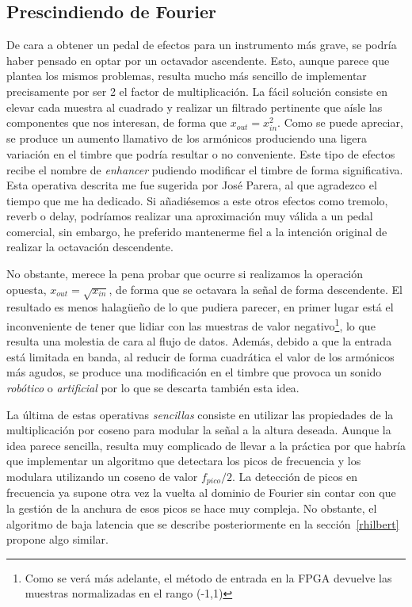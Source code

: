 \subsection{Prescindiendo de Fourier}
\label{nofourier}
De cara a obtener un pedal de efectos para un instrumento más grave, se podría haber pensado en optar por un octavador ascendente. Esto, aunque parece que plantea los mismos problemas, resulta mucho más sencillo de implementar precisamente por ser 2 el factor de multiplicación. La fácil solución consiste en elevar cada muestra al cuadrado y realizar un filtrado pertinente que aísle las componentes que nos interesan, de forma que $x_{out} = x_{in}^{2}$. Como se puede apreciar, se produce un aumento llamativo de los armónicos produciendo una ligera variación en el timbre que podría resultar o no conveniente. Este tipo de efectos recibe el nombre de \emph{enhancer} pudiendo modificar el timbre de forma significativa. Esta operativa descrita me fue sugerida por José Parera, al que agradezco el tiempo que me ha dedicado. Si añadiésemos a este otros efectos como tremolo, reverb o delay, podríamos realizar una aproximación muy válida a un pedal comercial, sin embargo, he preferido mantenerme fiel a la intención original de realizar la octavación descendente.

No obstante, merece la pena probar que ocurre si realizamos la operación opuesta, $x_{out} = \sqrt{x_{in}}$, de forma que se octavara la señal de forma descendente. El resultado es menos halagüeño de lo que pudiera parecer, en primer lugar está el inconveniente de tener que lidiar con las muestras de valor negativo\footnote{Como se verá más adelante, el método de entrada en la FPGA devuelve las muestras normalizadas en el rango (-1,1)}, lo que resulta una molestia de cara al flujo de datos. Además, debido a que la entrada está limitada en banda, al reducir de forma cuadrática el valor de los armónicos más agudos, se produce una modificación en el timbre que provoca un sonido \emph{robótico} o \emph{artificial} por lo que se descarta también esta idea.

La última de estas operativas \emph{sencillas} consiste en utilizar las propiedades de la multiplicación por coseno para modular la señal a la altura deseada. Aunque la idea parece sencilla, resulta muy complicado de llevar a la práctica por que habría que implementar un algoritmo que detectara los picos de frecuencia y los modulara utilizando un coseno de valor $f_{pico}/2$. La detección de picos en frecuencia ya supone otra vez la vuelta al dominio de Fourier sin contar con que la gestión de la anchura de esos picos se hace muy compleja. No obstante, el algoritmo de baja latencia que se describe posteriormente en la sección~\ref{rhilbert} propone algo similar.

